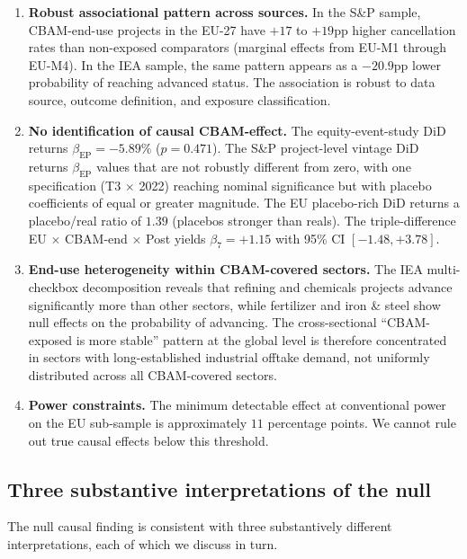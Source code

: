 \documentclass[11pt,a4paper]{article}
\newcommand{\bep}{\beta_{\mathrm{EP}}}
\begin{document}
\begin{enumerate}
\item \textbf{Robust associational pattern across sources.} In the S\&P sample, CBAM-end-use projects in the EU-27 have $+17$ to $+19$pp higher cancellation rates than non-exposed comparators (marginal effects from EU-M1 through EU-M4). In the IEA sample, the same pattern appears as a $-20.9$pp lower probability of reaching advanced status. The association is robust to data source, outcome definition, and exposure classification.

\item \textbf{No identification of causal CBAM-effect.} The equity-event-study DiD returns $\bep = -5.89\%$ ($p = 0.471$). The S\&P project-level vintage DiD returns $\bep$ values that are not robustly different from zero, with one specification (T3 $\times$ 2022) reaching nominal significance but with placebo coefficients of equal or greater magnitude. The EU placebo-rich DiD returns a placebo/real ratio of $1.39$ (placebos stronger than reals). The triple-difference EU $\times$ CBAM-end $\times$ Post yields $\beta_7 = +1.15$ with 95\% CI $[-1.48, +3.78]$.

\item \textbf{End-use heterogeneity within CBAM-covered sectors.} The IEA multi-checkbox decomposition reveals that refining and chemicals projects advance significantly more than other sectors, while fertilizer and iron \& steel show null effects on the probability of advancing. The cross-sectional ``CBAM-exposed is more stable'' pattern at the global level is therefore concentrated in sectors with long-established industrial offtake demand, not uniformly distributed across all CBAM-covered sectors.

\item \textbf{Power constraints.} The minimum detectable effect at conventional power on the EU sub-sample is approximately $11$ percentage points. We cannot rule out true causal effects below this threshold.
\end{enumerate}

\subsection{Three substantive interpretations of the null}

The null causal finding is consistent with three substantively different interpretations, each of which we discuss in turn.
\end{document}
